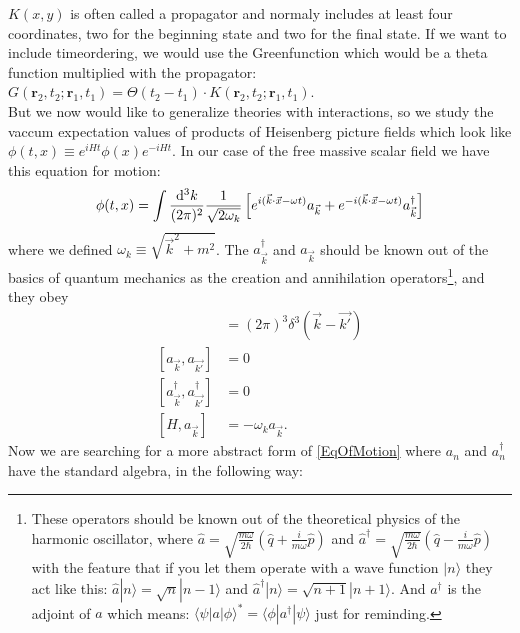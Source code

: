 	$K(x,y)$ is often called a propagator and normaly includes at least four coordinates, two for the beginning state and two for the final state. If we want to include timeordering, we would use the Greenfunction which would be a theta function multiplied with the propagator: $G(\textbf{r}_2,t_2;\textbf{r}_1,t_1)=\Theta(t_2-t_1)\cdot K(\textbf{r}_2,t_2;\textbf{r}_1,t_1)$.\cite{QEDbuch}\\
	
	But we now would like to generalize theories with interactions, so we study the vaccum expectation values of products of Heisenberg picture fields which look like $\phi(t,x) \equiv e^{iHt} \phi(x) e^{-iHt}$. In our case of the free massive scalar field we have this equation for motion:
		\begin{equation}  \label{EqOfMotion}
			\phi(t,x) = \int \frac{\mathrm{d}^3 k}{(2\pi)^2} \frac{1}{\sqrt{2\omega_k}} 
			\left[ e^{i(\vec{k}\cdot\vec{x}-\omega t)} a_{\vec{k}} +
			e^{-i(\vec{k}\cdot\vec{x}-\omega t)} a^{\dagger}_{\vec{k}}
			\right]
		\end{equation}
	where we defined $\omega_k \equiv \sqrt{\vec{k}^2+m^2}$. The $a^{\dagger}_{\vec{k}}$ and $a_{\vec{k}}$ should be known out of the basics of quantum mechanics as the creation and annihilation operators\footnote{These operators should be known out of the theoretical physics of the harmonic oscillator, where $\hat{a}= \sqrt{\frac{m\omega}{2\hbar}} 
		\left(\hat{q} + \frac{i}{m\omega}\hat{p}
		\right)
		$ and 
		$ \hat{a}^{\dagger}= \sqrt{\frac{m\omega}{2\hbar}} 
		\left(\hat{q} - \frac{i}{m\omega}\hat{p}
		\right)
		$
	with the feature that if you let them operate with a wave function $|n\rangle$ they act like this:
	$\hat{a}|n\rangle = \sqrt{n}|n-1\rangle$ and $\hat{a}^{\dagger}|n\rangle= \sqrt{n+1}|n+1\rangle$.
	And $a^{\dagger}$ is the adjoint of $a$ which means: $\langle \psi | a | \phi \rangle^*= \langle \phi | a^{\dagger} | \psi \rangle$ just for reminding.
	}, and they obey
		\begin{align*}
			[a_{\vec{k}},a^{\dagger}_{\vec{k'}}]&= (2\pi)^3 \delta^3 (\vec{k}-\vec{k'})\\
			[a_{\vec{k}},a_{\vec{k'}}]&=0 \\
			[a^{\dagger}_{\vec{k}},a^{\dagger}_{\vec{k'}}]&=0 \\
			[H,a_{\vec{k}}]&=-\omega_k a_{\vec{k}}.
		\end{align*}
	Now we are searching for a more abstract form of \eqref{EqOfMotion} where $a_n$ and $a^{\dagger}_n$ have the standard algebra, in the following way:
